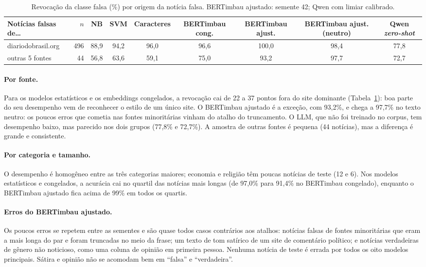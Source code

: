 \begin{table}[t]
\centering\small
\begin{adjustbox}{max width=\textwidth}
\begin{tabular}{lrccccccc}
\toprule
Notícias falsas de\ldots & $n$ & NB & SVM & Caracteres & BERTimbau cong. & BERTimbau ajust. & BERTimbau ajust. (neutro) & Qwen \emph{zero-shot} \\
\midrule
diariodobrasil.org & 496 & 88,9 & 94,2 & 96,0 & 96,6 & 100,0 & 98,4 & 77,8 \\
outras 5 fontes & 44 & 56,8 & 63,6 & 59,1 & 75,0 & 93,2 & 97,7 & 72,7 \\
\bottomrule
\end{tabular}
\end{adjustbox}
\caption{Revocação da classe falsa (\%) por origem da notícia falsa. BERTimbau ajustado: semente 42; Qwen com limiar calibrado.}
\label{tab:fonte}
\end{table}

\paragraph{Por fonte.} Para os modelos estatísticos e os embeddings congelados, a revocação cai de 22 a 37 pontos fora do site dominante (Tabela~\ref{tab:fonte}): boa parte do seu desempenho vem de reconhecer o estilo de um único site. O BERTimbau ajustado é a exceção, com 93,2\%, e chega a 97,7\% no texto neutro: os poucos erros que cometia nas fontes minoritárias vinham do atalho do truncamento. O LLM, que não foi treinado no corpus, tem desempenho baixo, mas parecido nos dois grupos (77,8\% e 72,7\%). A amostra de outras fontes é pequena (44 notícias), mas a diferença é grande e consistente.

\paragraph{Por categoria e tamanho.} O desempenho é homogêneo entre as três categorias maiores; economia e religião têm poucas notícias de teste (12 e 6). Nos modelos estatísticos e congelados, a acurácia cai no quartil das notícias mais longas (de 97,0\% para 91,4\% no BERTimbau congelado), enquanto o BERTimbau ajustado fica acima de 99\% em todos os quartis.

\paragraph{Erros do BERTimbau ajustado.} Os poucos erros se repetem entre as sementes e são quase todos casos contrários aos atalhos: notícias falsas de fontes minoritárias que eram a mais longa do par e foram truncadas no meio da frase; um texto de tom satírico de um site de comentário político; e notícias verdadeiras de gênero não noticioso, como uma coluna de opinião em primeira pessoa. Nenhuma notícia de teste é errada por todos os oito modelos principais. Sátira e opinião não se acomodam bem em ``falsa'' e ``verdadeira''.

